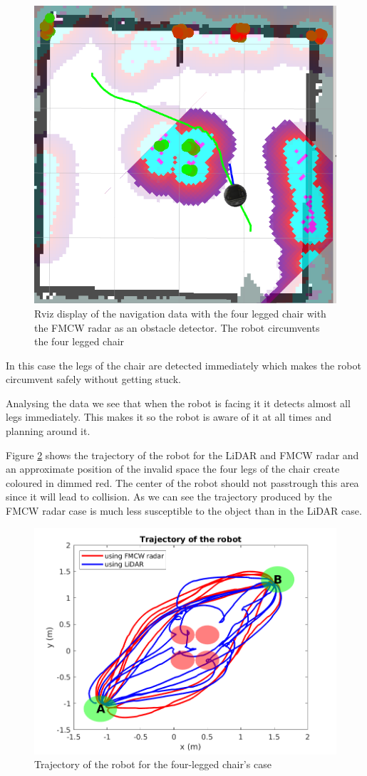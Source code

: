 \begin{figure}[ht!]
\centerline{\includegraphics [width=0.5 \textwidth]{imgs/chapter5/rviznchairradar.png}}
\caption[Navigation data with the four legged chair as an obstacle with \ac{FMCW} \ac{radar}]{Rviz display of the navigation data with the four legged chair with the \ac{FMCW} \ac{radar} as an obstacle detector. The robot circumvents the four legged chair}
\label{fig:rviznchairradar}
\end{figure}
In this case the legs of the chair are detected immediately which makes the robot circumvent safely without getting stuck. 


Analysing the data we see that when the robot is facing it it detects almost all legs immediately. 
This makes it so the robot is aware of it at all times and planning around it.


Figure \ref{fig:traj2} shows the trajectory of the robot for the \ac{LiDAR} and \ac{FMCW} \ac{radar} and an approximate position of the invalid space the four legs of the chair create coloured in dimmed red. The center of the robot should not passtrough this area since it will lead to collision. As we can see the trajectory  produced by the \ac{FMCW} radar case is much less susceptible to the object than in the \ac{LiDAR} case. 
\begin{figure}[ht!]
\centerline{\includegraphics [width=0.7 \textwidth]{imgs/chapter5/traj2.png}}
\caption{Trajectory of the robot for the four-legged chair's case}
\label{fig:traj2}
\end{figure}

